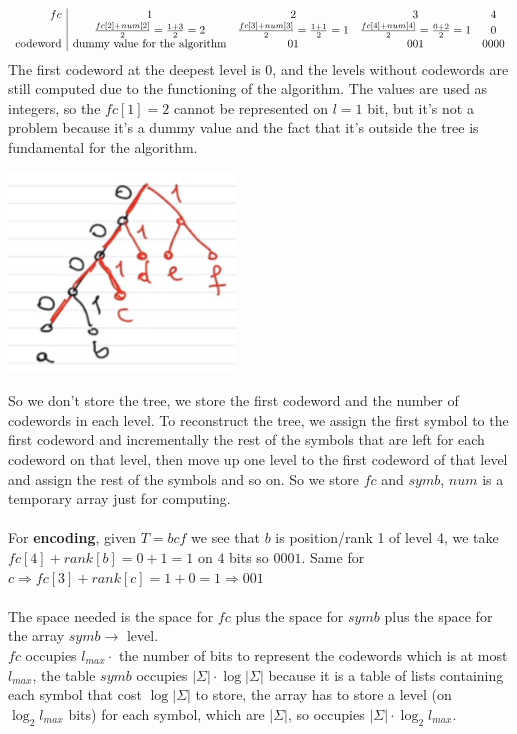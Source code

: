 \documentclass[10pt]{report}
\begin{document}
$$\begin{array}{r | c c c c}
fc & 1 & 2 & 3 & 4\\
 & \frac{fc[2] + num[2]}{2} = \frac{1 + 3}{2} = 2 & \frac{fc[3] + num[3]}{2} = \frac{1 + 1}{2} = 1 & \frac{fc[4] + num[4]}{2} = \frac{0 + 2}{2} = 1 & 0\\
\hbox{codeword} & \hbox{dummy value for the algorithm} & 01 & 001 & 0000
\end{array}$$
The first codeword at the deepest level is $0$, and the levels without codewords are still computed due to the functioning of the algorithm. The values are used as integers, so the $fc[1] = 2$ cannot be represented on $l=1$ bit, but it's not a problem because it's a dummy value and the fact that it's outside the tree is fundamental for the algorithm.
\begin{center}
	\includegraphics[scale=0.5]{18.png}
\end{center}
So we don't store the tree, we store the first codeword and the number of codewords in each level. To reconstruct the tree, we assign the first symbol to the first codeword and incrementally the rest of the symbols that are left for each codeword on that level, then move up one level to the first codeword of that level and assign the rest of the symbols and so on. So we store $fc$ and $symb$, $num$ is a temporary array just for computing.\\\\
For \textbf{encoding}, given $T=bcf$ we see that $b$ is position/rank 1 of level 4, we take $fc[4] + rank[b] = 0 + 1 = 1$ on $4$ bits so $0001$. Same for $c \Rightarrow fc[3] + rank[c] = 1 + 0 = 1 \Rightarrow 001$\\\\
The space needed is the space for $fc$ plus the space for $symb$ plus the space for the array $symb\rightarrow$ level.\\$fc$ occupies $l_{max}\cdot$ the number of bits to represent the codewords which is at most $l_{max}$, the table $symb$ occupies $|\Sigma|\cdot\log|\Sigma|$ because it is a table of lists containing each symbol that cost $\log|\Sigma|$ to store, the array has to store a level (on $\log_2 l_{max}$ bits) for each symbol, which are $|\Sigma|$, so occupies $|\Sigma|\cdot\log_2 l_{max}$.\\
\end{document}
